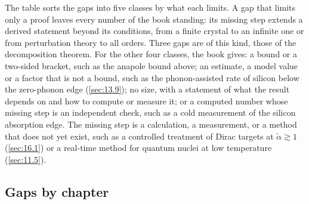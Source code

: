 The table sorts the gaps into five classes by what each limits. A gap that limits only a proof leaves every number of the book standing: its missing step extends a derived statement beyond its conditions, from a finite crystal to an infinite one or from perturbation theory to all orders. Three gaps are of this kind, those of the decomposition theorem. For the other four classes, the book gives: a bound or a two-sided bracket, such as the anapole bound above; an estimate, a model value or a factor that is not a bound, such as the phonon-assisted rate of silicon below the zero-phonon edge (\cref{sec:13.9}); no size, with a statement of what the result depends on and how to compute or measure it; or a computed number whose missing step is an independent check, such as a cold measurement of the silicon absorption edge. The missing step is a calculation, a measurement, or a method that does not yet exist, such as a controlled treatment of Dirac targets at $\tilde\alpha \gtrsim 1$ (\cref{sec:16.1}) or a real-time method for quantum nuclei at low temperature (\cref{sec:11.5}).

\subsection{Gaps by chapter}\label{sec:22.2-table}

